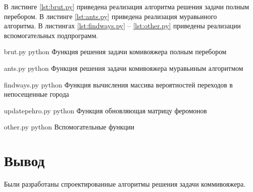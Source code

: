В листинге \ref{lst:brut.py} приведена реализация алгоритма решения задачи полным перебором. 
В листинге \ref{lst:ants.py} приведена реализация муравьиного алгоритма.
В листингах \ref{lst:findways.py} -- \ref{lst:other.py} приведены реализации вспомогательных подпрограмм.

\clearpage
{}
{brut.py} %
{python} %
{Функция решения задачи комивояжера полным перебором} %

\clearpage

{ants.py} %
{python} %
{Функция решения задачи комивояжера муравьиным алгоритмом} %

\clearpage

{findways.py} %
{python} %
{Функция вычисления массива вероятностей переходов в непосещенные города} %

\clearpage

{updatepehro.py} %
{python} %
{Функция обновляющая матрицу феромонов} %

\clearpage

{other.py} %
{python} %
{Вспомогательные функции} %

\clearpage

\section*{Вывод}
Были разработаны спроектированные алгоритмы решения задачи коммивояжера.
